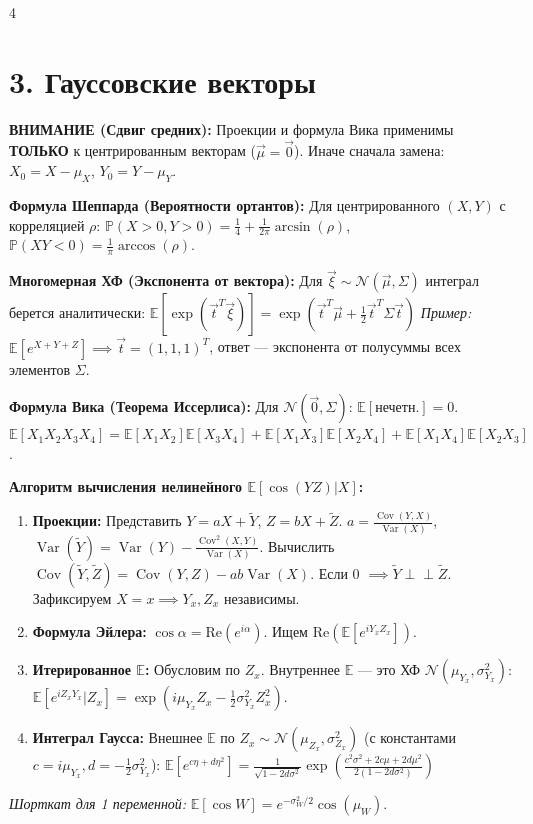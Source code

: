 \documentclass[8pt, a4paper, landscape]{extarticle}
\newcommand{\E}{\mathbb{E}}
\renewcommand{\P}{\mathbb{P}}
\newcommand{\N}{\mathcal{N}}
\DeclareMathOperator{\Var}{Var}
\DeclareMathOperator{\Cov}{Cov}
\begin{document}
\begin{multicols*}{4}
\section*{3. Гауссовские векторы}
\textbf{ВНИМАНИЕ (Сдвиг средних):} Проекции и формула Вика применимы \textbf{ТОЛЬКО} к центрированным векторам ($\vec{\mu}=\vec{0}$). Иначе сначала замена: $X_0 = X-\mu_X$, $Y_0=Y-\mu_Y$.

\textbf{Формула Шеппарда (Вероятности ортантов):} 
Для центрированного $(X,Y)$ с корреляцией $\rho$:
$\P(X \!>\! 0, Y \!>\! 0) \!=\! \frac{1}{4} + \frac{1}{2\pi}\arcsin(\rho)$, \ $\P(XY \!<\! 0) \!=\! \frac{1}{\pi}\arccos(\rho)$.

\textbf{Многомерная ХФ (Экспонента от вектора):}
Для $\vec{\xi} \sim \N(\vec{\mu}, \Sigma)$ интеграл берется аналитически:
$ \E[\exp(\vec{t}^T \vec{\xi})] = \exp\left( \vec{t}^T \vec{\mu} + \frac{1}{2} \vec{t}^T \Sigma \vec{t} \right) $
\textit{Пример:} $\E[e^{X+Y+Z}] \implies \vec{t}=(1,1,1)^T$, ответ --- экспонента от полусуммы всех элементов $\Sigma$.

\textbf{Формула Вика (Теорема Иссерлиса):} Для $\N(\vec{0}, \Sigma)$: $\E[\text{нечетн.}]=0$. $\E[X_1 X_2 X_3 X_4] = \E[X_1 X_2]\E[X_3 X_4] + \E[X_1 X_3]\E[X_2 X_4] + \E[X_1 X_4]\E[X_2 X_3]$.

\textbf{Алгоритм вычисления нелинейного $\E[\cos(YZ)|X]$:}
\begin{enumerate}
    \item \textbf{Проекции:} Представить $Y = aX+\tilde{Y}$, $Z=bX+\tilde{Z}$.
    $a \!=\! \frac{\Cov(Y,X)}{\Var(X)}$, $\Var(\tilde{Y}) \!=\! \Var(Y) - \frac{\Cov^2(X,Y)}{\Var(X)}$.
    Вычислить $\Cov(\tilde{Y},\tilde{Z}) \!=\! \Cov(Y,Z) - ab\Var(X)$. Если 0 $\implies \tilde{Y} \perp\!\!\perp \tilde{Z}$. Зафиксируем $X=x \implies Y_x, Z_x$ независимы.
    \item \textbf{Формула Эйлера:} $\cos \alpha = \text{Re}(e^{i\alpha})$. Ищем $\text{Re}(\E[e^{iY_x Z_x}])$.
    \item \textbf{Итерированное $\E$:} Обусловим по $Z_x$. Внутреннее $\E$ --- это ХФ $\N(\mu_{Y_x}, \sigma_{Y_x}^2)$: $\E[e^{i Z_x Y_x}|Z_x] = \exp(i\mu_{Y_x} Z_x - \frac{1}{2}\sigma_{Y_x}^2 Z_x^2)$.
    \item \textbf{Интеграл Гаусса:} Внешнее $\E$ по $Z_x \sim \N(\mu_{Z_x}, \sigma_{Z_x}^2)$ (с константами $c=i\mu_{Y_x}, d=-\frac{1}{2}\sigma_{Y_x}^2$):
    $ \E[e^{c\eta + d\eta^2}] = \frac{1}{\sqrt{1-2d\sigma^2}}\exp\left( \frac{c^2\sigma^2+2c\mu+2d\mu^2}{2(1-2d\sigma^2)} \right) $
\end{enumerate}
\textit{Шорткат для 1 переменной:} $\E[\cos W] = e^{-\sigma_W^2/2}\cos(\mu_W)$.


\end{multicols*}
\end{document}
